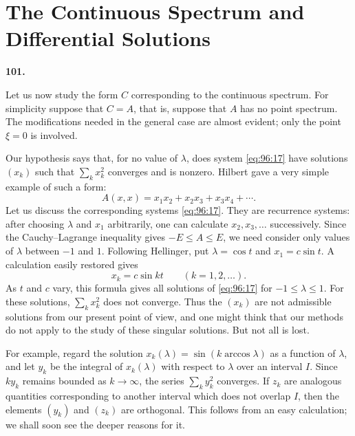 \documentclass[
  paper=b5,
  fontsize=13pt,
  twoside=true,
  open=any,
  bookmarkpackage=false,
  chapterprefix=true,
  headings=normal
]{scrbook}
\theoremstyle{definition}
\newcommand{\numberedparagraph}[1]{%
  \par\medskip\phantomsection\label{sec:#1}%
  \noindent\textbf{#1.}\enspace
}
\begin{document}
\section{The Continuous Spectrum and Differential Solutions}

\numberedparagraph{101}
Let us now study the form \(C\) corresponding to the continuous spectrum.  For
simplicity suppose that \(C=A\), that is, suppose that \(A\) has no point
spectrum.  The modifications needed in the general case are almost evident;
only the point \(\xi=0\) is involved.

Our hypothesis says that, for no value of \(\lambda\), does system
\eqref{eq:96:17} have solutions \((x_k)\) such that \(\sum_kx_k^2\) converges
and is nonzero.  Hilbert gave a very simple example of such a form:
\begin{equation}
  A(x,x)=x_1x_2+x_2x_3+x_3x_4+\cdots.
  \tag{23}\label{eq:101:23}
\end{equation}
Let us discuss the corresponding systems \eqref{eq:96:17}.  They are
recurrence systems: after choosing \(\lambda\) and \(x_1\) arbitrarily, one
can calculate \(x_2,x_3,\ldots\) successively.  Since the Cauchy--Lagrange
inequality gives \(-E\le A\le E\), we need consider only values of
\(\lambda\) between \(-1\) and \(1\).  Following Hellinger, put
\(\lambda=\cos t\) and \(x_1=c\sin t\).  A calculation easily restored gives
\[
  x_k=c\sin kt\qquad(k=1,2,\ldots).
\]
As \(t\) and \(c\) vary, this formula gives all solutions of
\eqref{eq:96:17} for \(-1\le\lambda\le1\).  For these solutions,
\(\sum_kx_k^2\) does not converge.  Thus the \((x_k)\) are not admissible
solutions from our present point of view, and one might think that our methods
do not apply to the study of these singular solutions.  But not all is lost.

For example, regard the solution
\(x_k(\lambda)=\sin(k\arccos\lambda)\) as a function of \(\lambda\), and let
\(y_k\) be the integral of \(x_k(\lambda)\) with respect to \(\lambda\) over
an interval \(I\).  Since \(ky_k\) remains bounded as \(k\to\infty\), the
series \(\sum_ky_k^2\) converges.  If \(z_k\) are analogous quantities
corresponding to another interval which does not overlap \(I\), then the
elements \((y_k)\) and \((z_k)\) are orthogonal.  This follows from an easy
calculation; we shall soon see the deeper reasons for it.
\end{document}

